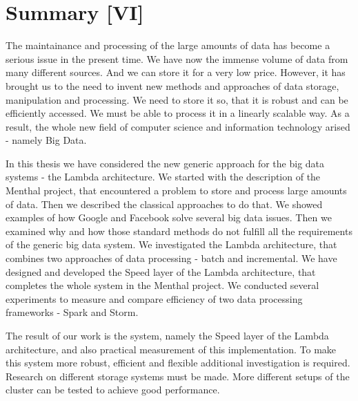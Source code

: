 \chapter{Summary [VI]}
\label{chap:summary}

The maintainance and processing of the large amounts of data has become a serious issue in the present time.
We have now the immense volume of data from many different sources.
And we can store it for a very low price.
However, it has brought us to the need to invent new methods and approaches of data storage, manipulation and processing.
We need to store it so, that it is robust and can be efficiently accessed.
We must be able to process it in a linearly scalable way.
As a result, the whole new field of computer science and information technology arised - namely Big Data.

In this thesis we have considered the new generic approach for the big data systems - the Lambda architecture.
We started with the description of the Menthal project, that encountered a problem to store and process large amounts of data.
Then we described the classical approaches to do that.
We showed examples of how Google and Facebook solve several big data issues.
Then we examined why and how those standard methods do not fulfill all the requirements of the generic big data system.
We investigated the Lambda architecture, that combines two approaches of data processing - batch and incremental.
We have designed and developed the Speed layer of the Lambda architecture, that completes the whole system in the Menthal project.
We conducted several experiments to measure and compare efficiency of two data processing frameworks - Spark and Storm.

The result of our work is the system, namely the Speed layer of the Lambda architecture, and also practical measurement of this implementation.
To make this system more robust, efficient and flexible additional investigation is required.
Research on different storage systems must be made.
More different setups of the cluster can be tested to achieve good performance.